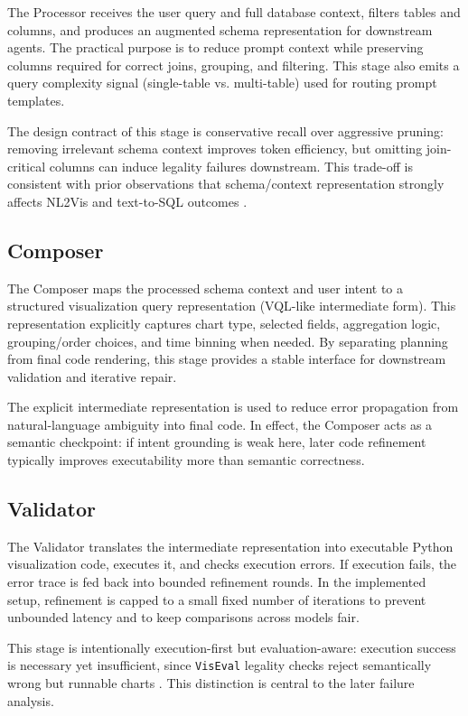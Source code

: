 \documentclass[a4paper,oneside,bibliography=totoc]{scrbook}
\begin{document}
The Processor receives the user query and full database context, filters tables and columns, and produces an augmented schema representation for downstream agents. The practical purpose is to reduce prompt context while preserving columns required for correct joins, grouping, and filtering. This stage also emits a query complexity signal (single-table vs.
multi-table) used for routing prompt templates.

The design contract of this stage is conservative recall over aggressive pruning: removing irrelevant schema context improves token efficiency, but omitting join-critical columns can induce legality failures downstream. This trade-off is consistent with prior observations that schema/context representation strongly affects NL2Vis and text-to-SQL outcomes \cite{wu2024automated,li2025prompt4vis}.

\subsection{Composer}

The Composer maps the processed schema context and user intent to a structured visualization query representation (VQL-like intermediate form). This representation explicitly captures chart type, selected fields, aggregation logic, grouping/order choices, and time binning when needed. By separating planning from final code rendering, this stage provides a stable interface for downstream validation and iterative repair.

The explicit intermediate representation is used to reduce error propagation from natural-language ambiguity into final code. In effect, the Composer acts as a semantic checkpoint: if intent grounding is weak here, later code refinement typically improves executability more than semantic correctness.

\subsection{Validator}

The Validator translates the intermediate representation into executable Python visualization code, executes it, and checks execution errors. If execution fails, the error trace is fed back into bounded refinement rounds. In the implemented setup, refinement is capped to a small fixed number of iterations to prevent unbounded latency and to keep comparisons across models fair.

This stage is intentionally execution-first but evaluation-aware: execution success is necessary yet insufficient, since \texttt{VisEval} legality checks reject semantically wrong but runnable charts \cite{chen2025viseval}. This distinction is central to the later failure analysis.
\end{document}
